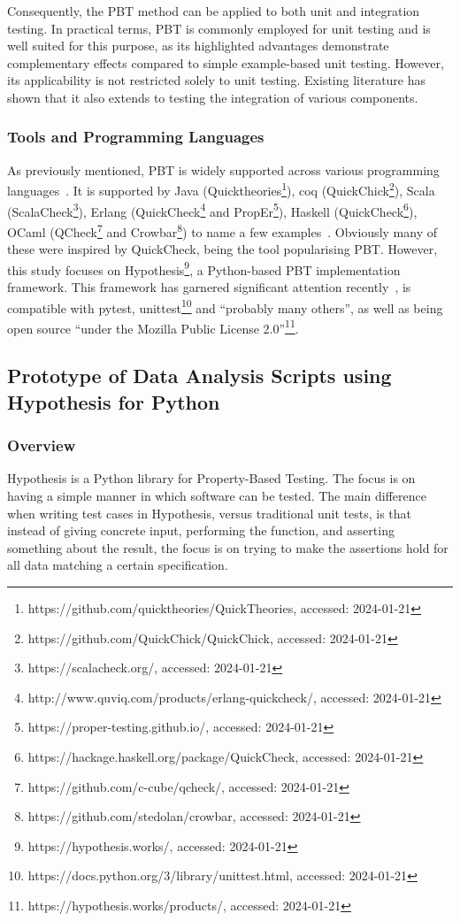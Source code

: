 \documentclass[runningheads]{llncs}
\begin{document}
Consequently, the PBT method can be applied to both unit and integration testing. In practical terms, PBT is commonly employed for unit testing and is well suited for this purpose, as its highlighted advantages demonstrate complementary effects compared to simple example-based unit testing. However, its applicability is not restricted solely to unit testing. Existing literature has shown that it also extends to testing the integration of various components.

\subsubsection{Tools and Programming Languages}
As previously mentioned, PBT is widely supported across various programming languages~\cite{Chen2022,Shi2023}. It is supported by Java (Quicktheories\footnote{https://github.com/quicktheories/QuickTheories, accessed: 2024-01-21}), coq (QuickChick\footnote{https://github.com/QuickChick/QuickChick, accessed: 2024-01-21}), Scala (ScalaCheck\footnote{https://scalacheck.org/, accessed: 2024-01-21}), Erlang (QuickCheck\footnote{http://www.quviq.com/products/erlang-quickcheck/, accessed: 2024-01-21} and PropEr\footnote{https://proper-testing.github.io/, accessed: 2024-01-21}), Haskell (QuickCheck\footnote{https://hackage.haskell.org/package/QuickCheck, accessed: 2024-01-21}), OCaml (QCheck\footnote{https://github.com/c-cube/qcheck/, accessed: 2024-01-21} and Crowbar\footnote{https://github.com/stedolan/crowbar, accessed: 2024-01-21}) to name a few examples~\cite{MacIver2016,Padhye2019,Paraskevopoulou2015,Arts2008,Papadakis2011,Claessen2000}. Obviously many of these were inspired by QuickCheck, being the tool popularising PBT. However, this study focuses on Hypothesis\footnote{https://hypothesis.works/, accessed: 2024-01-21}, a Python-based PBT implementation framework. This framework has garnered significant attention recently~\cite{Corgozinho2023,MacIver2019}, is compatible with pytest, unittest\footnote{https://docs.python.org/3/library/unittest.html, accessed: 2024-01-21} and ``probably many others'', as well as being open source ``under the Mozilla Public License 2.0''\footnote{https://hypothesis.works/products/, accessed: 2024-01-21}.

\subsection{Prototype of Data Analysis Scripts using Hypothesis for Python}
\subsubsection{Overview}
Hypothesis is a Python library for Property-Based Testing. The focus is on having a simple manner in which software can be tested. The main difference when writing test cases in Hypothesis, versus traditional unit tests, is that instead of giving concrete input, performing the function, and asserting something about the result, the focus is on trying to make the assertions hold for all data matching a certain specification.
\end{document}
